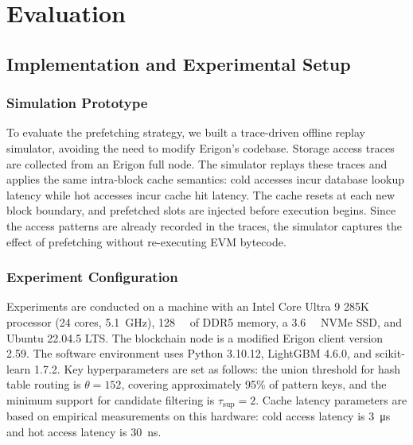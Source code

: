 \documentclass[conference]{IEEEtran}
\begin{document}



\section{Evaluation}
\label{sec:evaluation}

\subsection{Implementation and Experimental Setup}

\subsubsection{Simulation Prototype}

To evaluate the prefetching strategy, we built a trace-driven offline replay simulator, avoiding the need to modify Erigon's codebase. Storage access traces are collected from an Erigon full node. The simulator replays these traces and applies the same intra-block cache semantics: cold accesses incur database lookup latency while hot accesses incur cache hit latency. The cache resets at each new block boundary, and prefetched slots are injected before execution begins. Since the access patterns are already recorded in the traces, the simulator captures the effect of prefetching without re-executing EVM bytecode.


\subsubsection{Experiment Configuration}
\label{sec:experiment-configuration}

Experiments are conducted on a machine with an Intel Core Ultra 9 285K processor (24 cores, \qty{5.1}{\giga\hertz}), \qty{128}{\giga\byte} of DDR5 memory, a \qty{3.6}{\tera\byte} NVMe SSD, and Ubuntu 22.04.5 LTS. The blockchain node is a modified Erigon client version 2.59. The software environment uses Python 3.10.12, LightGBM 4.6.0, and scikit-learn 1.7.2. Key hyperparameters are set as follows: the union threshold for hash table routing is $\theta = 152$, covering approximately 95\% of pattern keys, and the minimum support for candidate filtering is $\tau_{\text{sup}} = 2$. Cache latency parameters are based on empirical measurements on this hardware: cold access latency is \qty{3}{\micro\second} and hot access latency is \qty{30}{\nano\second}.
\end{document}
